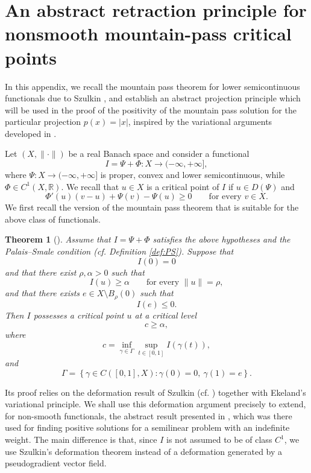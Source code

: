 \documentclass[11pt,reqno]{amsart}
\theoremstyle{plain}
\newtheorem{theorem}{Theorem}[section]
\theoremstyle{definition}
\numberwithin{equation}{section}
\begin{document}
\appendix

\section{An abstract retraction principle for nonsmooth mountain-pass critical points}
\label{app:mountain-pass}

In this appendix, we recall the mountain pass theorem for
lower semicontinuous functionals due to Szulkin \cite{Sz86}, and
establish an abstract projection principle which will be used in the
proof of the positivity of the mountain pass solution for the particular projection $p(x) = |x|$, inspired by the variational arguments developed in \cite{BCN95}.

\medskip 

Let $(X,\| \cdot \|)$ be a real Banach space and consider a functional
$$
I=\Psi+\Phi:X\rightarrow(-\infty,+\infty],
$$
where $\Psi:X\to(-\infty,+\infty]$ is proper, convex and lower
semicontinuous, while $\Phi\in C^1(X,\mathbb R)$. We recall that
$u\in X$ is a critical point of $I$ if $u\in D(\Psi)$ and
$$
\Phi'(u)(v-u)+\Psi(v)-\Psi(u)\geq 0
\qquad\text{for every }v\in X.
$$
We first recall the version of the mountain pass theorem that is
suitable for the above class of functionals.

\begin{theorem}[{\cite[Theorem 3.2]{Sz86}}]
\label{thm:szulkin-mountain-pass}
Assume that $I=\Psi+\Phi$ satisfies the above hypotheses and the
Palais--Smale condition (cf. Definition \ref{def:PS}). Suppose that
$$
I(0)=0
$$
and that there exist $\rho,\alpha>0$ such that
$$
I(u)\geq\alpha
\qquad\text{for every } \|u\| = \rho,
$$
and that there exists $e\in X\setminus B_\rho(0)$ such that
$$
I(e)\leq 0.
$$
Then $I$ possesses a critical point $u$ at a critical level
$$
c\geq\alpha,
$$
where
$$
c=\inf_{\gamma\in\Gamma}\sup_{t\in[0,1]}I(\gamma(t)),
$$
and
$$
\Gamma
=
\left\{
\gamma\in C([0,1],X):
\gamma(0)=0,\ \gamma(1)=e
\right\}.
$$
\end{theorem}

Its proof relies on the deformation result of Szulkin (cf. \cite[Proposition 2.3]{Sz86}) together with
Ekeland's variational principle. We shall use this deformation argument precisely to extend, for non-smooth functionals, the abstract result presented in \cite[Theorem 10]{BCN95}, which was there used for finding positive solutions for a semilinear problem with an indefinite weight. The main difference is that, since $I$ is not assumed
to be of class $C^1$, we use Szulkin's deformation theorem instead of
a deformation generated by a pseudogradient vector field.
\end{document}
